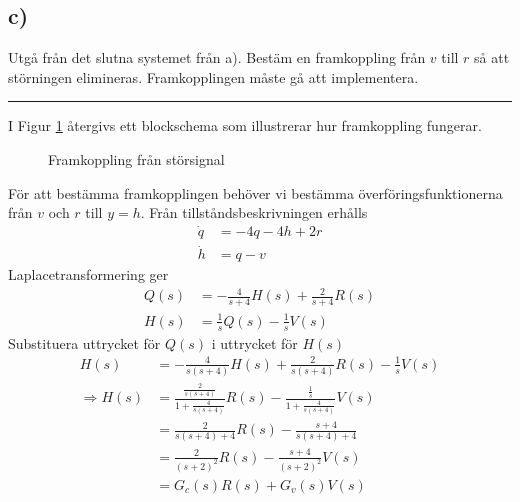 \documentclass[12pt]{article}
\newcommand{\qline}{\hrule \vspace*{10pt}}
\begin{document}
\subsection*{c)}
Utgå från det slutna systemet från a). Bestäm en framkoppling från $v$ till $r$ så att störningen  elimineras. Framkopplingen måste gå att implementera.
\qline
I Figur \ref{fig:fram} återgivs ett blockschema som illustrerar hur framkoppling fungerar.

\begin{figure}[h!]
  \centering
{}  
  \caption{Framkoppling från störsignal}
  \label{fig:fram}
\end{figure}
\FloatBarrier
För att bestämma framkopplingen behöver vi bestämma överföringsfunktionerna från $v$ och $r$ till $y = h$. Från tillståndsbeskrivningen erhålls
\begin{align*}
  \dot{q} &= -4q-4h + 2r \\
  \dot{h} &= q-v
\end{align*}
Laplacetransformering ger
\begin{align*}
  Q(s) &= -\frac{4}{s+4}H(s) + \frac{2}{s+4}R(s) \\
  H(s) &= \frac{1}{s}Q(s) - \frac{1}{s}V(s)
\end{align*}
Substituera uttrycket för $Q(s)$ i uttrycket för $H(s)$ 
\begin{align*}
  H(s) &= -\frac{4}{s(s+4)}H(s) + \frac{2}{s(s+4)}R(s)-\frac{1}{s}V(s) \\
  \Rightarrow H(s) &= \frac{\frac{2}{s(s+4)}}{1+\frac{4}{s(s+4)}}R(s) - \frac{\frac{1}{s}}{1+\frac{4}{s(s+4)}}V(s) \\
       &= \frac{2}{s(s+4)+4}R(s) - \frac{s+4}{s(s+4)+4} \\
       &= \frac{2}{(s+2)^2}R(s) - \frac{s+4}{(s+2)^2}V(s) \\
       &= G_c(s)R(s) + G_v(s)V(s)
\end{align*}
\end{document}
